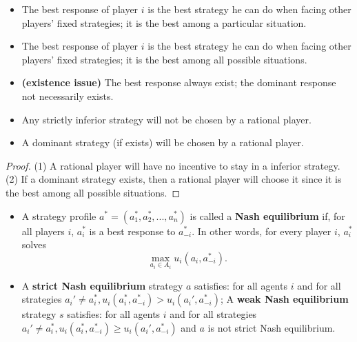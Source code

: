 \begin{refsection}
\begin{definition}
	
\end{definition}


\begin{note}[interpretation]\hfill
\begin{itemize}
	\item The best response of player $i$ is the best strategy he can do when facing other players' fixed strategies; it is the best among a particular situation.
	\item The best response of player $i$ is the best strategy he can do when facing other players' fixed strategies; it is the best among all possible situations.
	\item \textbf{(existence issue)} The best response always exist; the dominant response not necessarily exists.
\end{itemize}	
\end{note}

\begin{theorem}\cite[6]{gibbons1992game}\hfill
\begin{itemize}
	\item Any strictly inferior strategy will not be chosen by a rational player.
	\item A dominant strategy (if exists) will be chosen by a rational player.
\end{itemize}	 
\end{theorem}
\begin{proof}
(1) A rational player will have no incentive to stay in a inferior strategy.
(2) If a dominant strategy exists, then a rational player will choose it since it is the best among all possible situations.	
\end{proof}


\begin{definition}
	\cite[11]{leyton2008essentials}\cite[8]{gibbons1992game}\hfill
	\begin{itemize}
		\item A strategy profile $a^*=(a_1^*,a_2^*,...,a_n^*)$ is called a \textbf{Nash equilibrium} if, for all players $i$, $a_i^*$ is a best response to $a_{-i}^*$. In other words, for every player $i$,
		$a_i^*$ solves
		$$\max_{a_i \in A_i} u_i(a_i, a_{-i}^*).$$
		\item  A \textbf{strict Nash equilibrium} strategy $a$ satisfies: for all agents $i$ and for all strategies $a_i' \neq a_i^*, u_i(a_i^*,a_{-i}^*) > u_i(a_i',a_{-i}^*)$; A \textbf{weak Nash equilibrium} strategy $s$ satisfies: for all agents $i$ and for all strategies $a_i' \neq a_i^*, u_i(a_i^*,a_{-i}^*) \geq u_i(a_i',a_{-i}^*)$ and $a$ is not strict Nash equilibrium.
	\end{itemize}
\end{definition}



\end{refsection}
